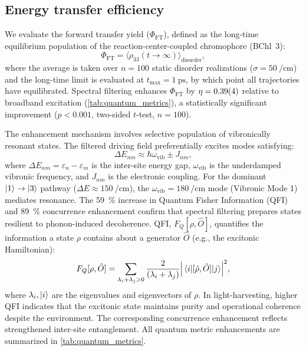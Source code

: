 \documentclass[journal=jpcl,manuscript=letter]{achemso}
\begin{document}
\subsection*{Energy transfer efficiency}

We evaluate the forward transfer yield ($\Phi_{\mathrm{FT}}$), defined as the long-time equilibrium population of the reaction-center-coupled chromophore (BChl~3):
\begin{equation}
\Phi_{\mathrm{FT}} = \bigl\langle \rho_{33}(t \to \infty) \bigr\rangle_{\mathrm{disorder}},
\label{eq:ETE}
\end{equation}
where the average is taken over $n=100$ static disorder realizations ($\sigma = \SI{50}{\per\centi\meter}$) and the long-time limit is evaluated at $t_{\max} = \SI{1}{\pico\second}$, by which point all trajectories have equilibrated. Spectral filtering enhances $\Phi_{\mathrm{FT}}$ by $\eta = \num{0.39 \pm 0.04}$ relative to broadband excitation (\cref{tab:quantum_metrics}), a statistically significant improvement ($p < 0.001$, two-sided $t$-test, $n=100$).

The enhancement mechanism involves selective population of vibronically resonant states. The filtered driving field preferentially excites modes satisfying:
\begin{equation}
\Delta E_{nm} \approx \hbar\omega_{\mathrm{vib}} \pm J_{nm},
\label{eq:resonance_condition}
\end{equation}
where $\Delta E_{nm} = \varepsilon_n - \varepsilon_m$ is the inter-site energy gap, $\omega_{\mathrm{vib}}$ is the underdamped vibronic frequency, and $J_{nm}$ is the electronic coupling. For the dominant $\ket{1} \to \ket{3}$ pathway ($\Delta E \approx \SI{150}{\per\centi\meter}$), the $\omega_{\mathrm{vib}} = \SI{180}{\per\centi\meter}$ mode (Vibronic Mode 1) mediates resonance.\cite{Chin2013,Fleming2015,Scholes2015} The \SI{59}{\percent} increase in Quantum Fisher Information (QFI) and \SI{89}{\percent} concurrence enhancement confirm that spectral filtering prepares states resilient to phonon-induced decoherence. QFI, $F_Q[\rho, \hat{O}]$, quantifies the information a state $\rho$ contains about a generator $\hat{O}$ (e.g., the excitonic Hamiltonian):
\begin{equation}
F_Q[\rho, \hat{O}] = \sum_{\lambda_i + \lambda_j > 0} \frac{2}{(\lambda_i + \lambda_j)} \abs{\mel{i}{[\hat{\rho}, \hat{O}]}{j}}^2,
\label{eq:QFI}
\end{equation}
where $\lambda_i, \ket{i}$ are the eigenvalues and eigenvectors of $\rho$. In light-harvesting, higher QFI indicates that the excitonic state maintains purity and operational coherence despite the environment.\cite{Pezze2009} The corresponding concurrence enhancement reflects strengthened inter-site entanglement. All quantum metric enhancements are summarized in \cref{tab:quantum_metrics}.
\end{document}

